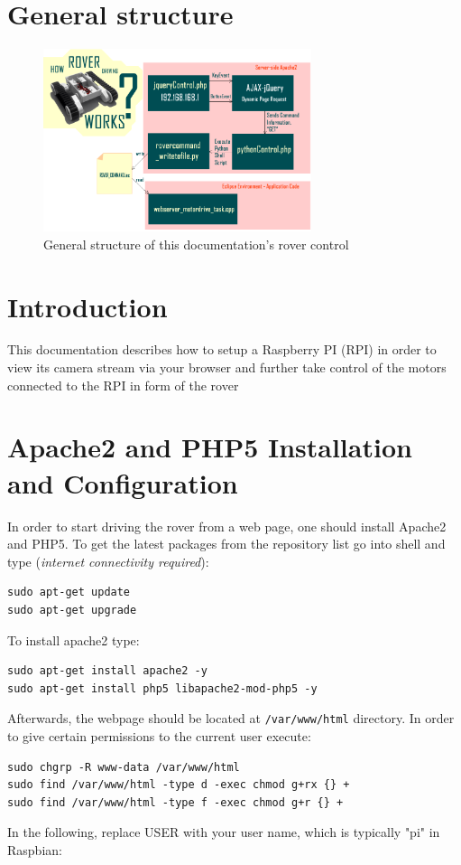 \section{General structure}
\begin{figure}[h!]
\centering
\includegraphics[width=0.7\textwidth]{structure.png}
\caption{General structure of this documentation's rover control}
\label{fig:struct}
\end{figure}

\section{Introduction}
This documentation describes how to setup a Raspberry PI (RPI) in order to view its camera stream via your browser and further take control of the motors connected to the RPI in form of the rover %

\section{Apache2 and PHP5 Installation and Configuration}
	In order to start driving the rover from a web page, one should install Apache2 and PHP5. To get the latest packages from the repository list go into shell and type (\textit{internet connectivity required}):
\begin{lstlisting}
sudo apt-get update
sudo apt-get upgrade
\end{lstlisting}
To install apache2 type:
\begin{lstlisting}
sudo apt-get install apache2 -y
sudo apt-get install php5 libapache2-mod-php5 -y
\end{lstlisting}
Afterwards, the webpage should be located at \texttt{/var/www/html} directory. In order to give certain permissions to the current user execute: 
\begin{lstlisting}
sudo chgrp -R www-data /var/www/html
sudo find /var/www/html -type d -exec chmod g+rx {} +
sudo find /var/www/html -type f -exec chmod g+r {} +
\end{lstlisting}
In the following, replace USER with your user name, which is typically "pi" in Raspbian:

